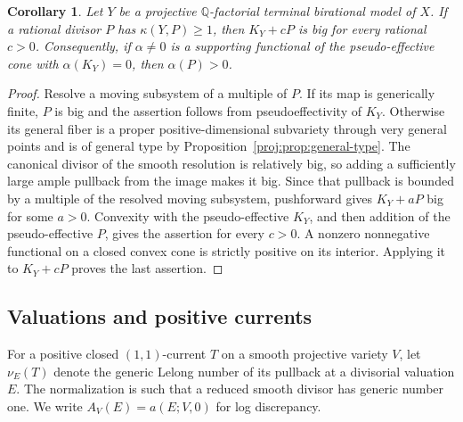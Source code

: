 \documentclass[11pt,letterpaper]{article}
\newcommand{\Q}{\mathbb{Q}}
\newtheorem{corollary}[theorem]{Corollary}
\theoremstyle{definition}
\theoremstyle{remark}
\begin{document}
\begin{corollary}\label{proj:ex:supporting}
Let \(Y\) be a projective \(\Q\)-factorial terminal birational model
of \(X\). If a rational divisor \(P\) has \(\kappa(Y,P)\geq1\),
then \(K_Y+cP\) is big for every rational \(c>0\).
Consequently, if \(\alpha\neq0\) is a supporting functional of the
pseudo-effective cone with \(\alpha(K_Y)=0\), then
\(\alpha(P)>0\).
\end{corollary}
\begin{proof}
Resolve a moving subsystem of a multiple of \(P\). If its map is
generically finite, \(P\) is big and the assertion follows from
pseudoeffectivity of \(K_Y\). Otherwise its general fiber is a
proper positive-dimensional subvariety through very general
points and is of general type by Proposition~\ref{proj:prop:general-type}.
The canonical divisor of the smooth resolution is relatively big,
so adding a sufficiently large ample pullback from the image makes
it big. Since that pullback is bounded by a multiple of the
resolved moving subsystem, pushforward gives \(K_Y+aP\) big for
some \(a>0\). Convexity with the pseudo-effective \(K_Y\), and then
addition of the pseudo-effective \(P\), gives the assertion for
every \(c>0\). A nonzero nonnegative functional on a closed convex
cone is strictly positive on its interior. Applying it to
\(K_Y+cP\) proves the last assertion.
\end{proof}

\subsection{Valuations and positive currents}

For a positive closed \((1,1)\)-current \(T\) on a smooth projective
variety \(V\), let \(\nu_E(T)\) denote the generic Lelong number of
its pullback at a divisorial valuation \(E\). The normalization is
such that a reduced smooth divisor has generic number one. We
write \(A_V(E)=a(E;V,0)\) for log discrepancy.
\end{document}

